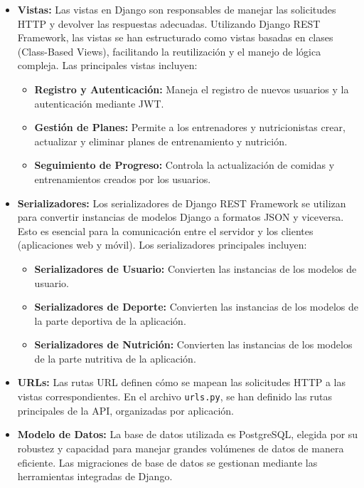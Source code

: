 \begin{itemize}
    \item \textbf{Vistas:} Las vistas en Django son responsables de manejar las solicitudes HTTP y devolver las respuestas adecuadas. Utilizando Django REST Framework, las vistas se han estructurado como vistas basadas en clases (Class-Based Views), facilitando la reutilización y el manejo de lógica compleja. Las principales vistas incluyen:
    \begin{itemize}
        \item \textbf{Registro y Autenticación:} Maneja el registro de nuevos usuarios y la autenticación mediante JWT.
        \item \textbf{Gestión de Planes:} Permite a los entrenadores y nutricionistas crear, actualizar y eliminar planes de entrenamiento y nutrición.
        \item \textbf{Seguimiento de Progreso:} Controla la actualización de comidas y entrenamientos creados por los usuarios.
    \end{itemize}
    
    \item \textbf{Serializadores:} Los serializadores de Django REST Framework se utilizan para convertir instancias de modelos Django a formatos JSON y viceversa. Esto es esencial para la comunicación entre el servidor y los clientes (aplicaciones web y móvil). Los serializadores principales incluyen:
    \begin{itemize}
        \item \textbf{Serializadores de Usuario:} Convierten las instancias de los modelos de usuario.
        \item \textbf{Serializadores de Deporte:} Convierten las instancias de los modelos de la parte deportiva de la aplicación.
        \item \textbf{Serializadores de Nutrición:} Convierten las instancias de los modelos de la parte nutritiva de la aplicación.
    \end{itemize}
    
    \item \textbf{URLs:} Las rutas URL definen cómo se mapean las solicitudes HTTP a las vistas correspondientes. En el archivo \texttt{urls.py}, se han definido las rutas principales de la API, organizadas por aplicación.
    
    \item \textbf{Modelo de Datos:} La base de datos utilizada es PostgreSQL, elegida por su robustez y capacidad para manejar grandes volúmenes de datos de manera eficiente. Las migraciones de base de datos se gestionan mediante las herramientas integradas de Django.
    

\end{itemize}
